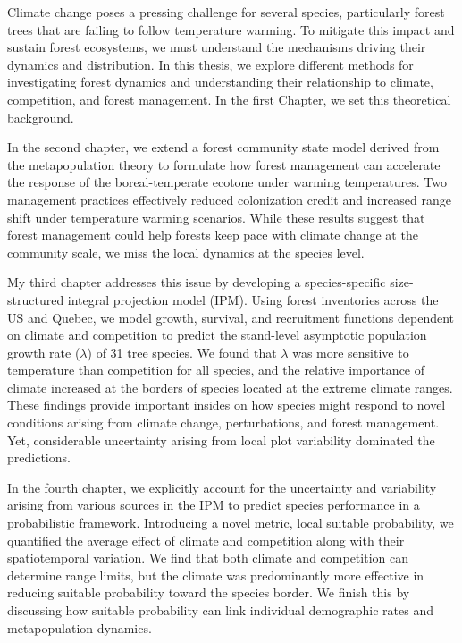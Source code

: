 Climate change poses a pressing challenge for several species, particularly forest trees that are failing to follow temperature warming. To mitigate this impact and sustain forest ecosystems, we must understand the mechanisms driving their dynamics and distribution. In this thesis, we explore different methods for investigating forest dynamics and understanding their relationship to climate, competition, and forest management. In the first Chapter, we set this theoretical background.

In the second chapter, we extend a forest community state model derived from the metapopulation theory to formulate how forest management can accelerate the response of the boreal-temperate ecotone under warming temperatures. Two management practices effectively reduced colonization credit and increased range shift under temperature warming scenarios. While these results suggest that forest management could help forests keep pace with climate change at the community scale, we miss the local dynamics at the species level.

My third chapter addresses this issue by developing a species-specific size-structured integral projection model (IPM). Using forest inventories across the US and Quebec, we model growth, survival, and recruitment functions dependent on climate and competition to predict the stand-level asymptotic population growth rate ($\lambda$) of 31 tree species. We found that $\lambda$ was more sensitive to temperature than competition for all species, and the relative importance of climate increased at the borders of species located at the extreme climate ranges. These findings provide important insides on how species might respond to novel conditions arising from climate change, perturbations, and forest management. Yet, considerable uncertainty arising from local plot variability dominated the predictions.

In the fourth chapter, we explicitly account for the uncertainty and variability arising from various sources in the IPM to predict species performance in a probabilistic framework. Introducing a novel metric, local suitable probability, we quantified the average effect of climate and competition along with their spatiotemporal variation. We find that both climate and competition can determine range limits, but the climate was predominantly more effective in reducing suitable probability toward the species border. We finish this by discussing how suitable probability can link individual demographic rates and metapopulation dynamics.

